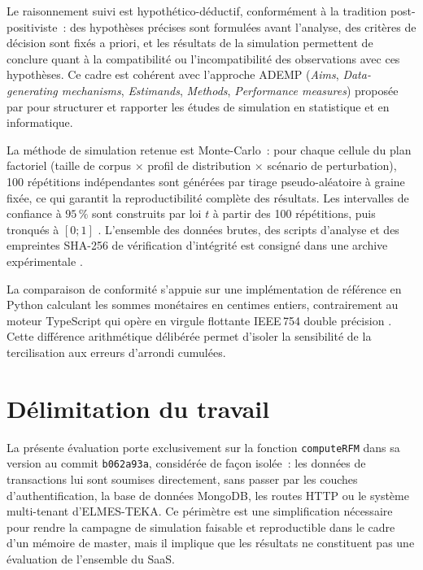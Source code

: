 Le raisonnement suivi est hypothético-déductif, conformément à la tradition post-positiviste~:
des hypothèses précises sont formulées avant l'analyse, des critères de décision sont fixés
a priori, et les résultats de la simulation permettent de conclure quant à la compatibilité
ou l'incompatibilité des observations avec ces hypothèses. Ce cadre est cohérent avec
l'approche ADEMP (\emph{Aims}, \emph{Data-generating mechanisms}, \emph{Estimands},
\emph{Methods}, \emph{Performance measures}) proposée par \citet{Morris2019} pour structurer
et rapporter les études de simulation en statistique et en informatique.

La méthode de simulation retenue est Monte-Carlo~: pour chaque cellule du plan factoriel
(taille de corpus × profil de distribution × scénario de perturbation), 100 répétitions
indépendantes sont générées par tirage pseudo-aléatoire à graine fixée, ce qui garantit la
reproductibilité complète des résultats. Les intervalles de confiance à $95\,\%$ sont
construits par loi $t$ à partir des 100 répétitions, puis tronqués à $[0;1]$
\citep{Lakens2013}. L'ensemble des données brutes, des scripts d'analyse et des empreintes
SHA-256 de vérification d'intégrité est consigné dans une archive expérimentale \citep{ViannaFilho2026}.

La comparaison de conformité s'appuie sur une implémentation de référence en Python calculant
les sommes monétaires en centimes entiers, contrairement au moteur TypeScript qui opère en
virgule flottante IEEE\,754 double précision \citep{Haissinsky2012, Ribatet_nd}. Cette
différence arithmétique délibérée permet d'isoler la sensibilité de la tercilisation aux
erreurs d'arrondi cumulées.

\section*{Délimitation du travail}

La présente évaluation porte exclusivement sur la fonction \texttt{computeRFM} dans sa
version au commit \texttt{b062a93a}, considérée de façon isolée~: les données de
transactions lui sont soumises directement, sans passer par les couches d'authentification,
la base de données MongoDB, les routes HTTP ou le système multi-tenant d'ELMES-TEKA. Ce
périmètre est une simplification nécessaire pour rendre la campagne de simulation faisable
et reproductible dans le cadre d'un mémoire de master, mais il implique que les résultats
ne constituent pas une évaluation de l'ensemble du SaaS.


